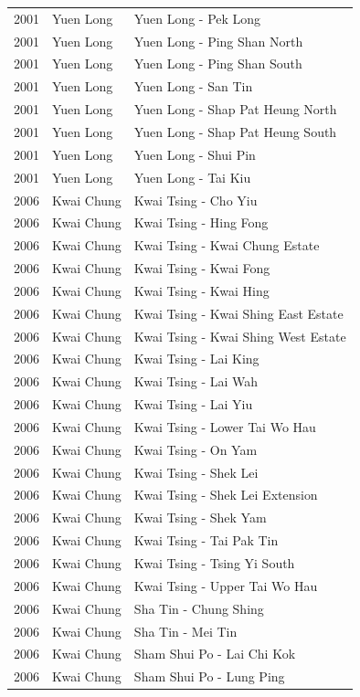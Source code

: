 \begin{longtable}{p{1.2cm}p{3cm}p{7cm}}
2001 & Yuen Long & Yuen Long - Pek Long \\
2001 & Yuen Long & Yuen Long - Ping Shan North \\
2001 & Yuen Long & Yuen Long - Ping Shan South \\
2001 & Yuen Long & Yuen Long - San Tin \\
2001 & Yuen Long & Yuen Long - Shap Pat Heung North \\
2001 & Yuen Long & Yuen Long - Shap Pat Heung South \\
2001 & Yuen Long & Yuen Long - Shui Pin \\
2001 & Yuen Long & Yuen Long - Tai Kiu \\
2006 & Kwai Chung & Kwai Tsing - Cho Yiu \\
2006 & Kwai Chung & Kwai Tsing - Hing Fong \\
2006 & Kwai Chung & Kwai Tsing - Kwai Chung Estate \\
2006 & Kwai Chung & Kwai Tsing - Kwai Fong \\
2006 & Kwai Chung & Kwai Tsing - Kwai Hing \\
2006 & Kwai Chung & Kwai Tsing - Kwai Shing East Estate \\
2006 & Kwai Chung & Kwai Tsing - Kwai Shing West Estate \\
2006 & Kwai Chung & Kwai Tsing - Lai King \\
2006 & Kwai Chung & Kwai Tsing - Lai Wah \\
2006 & Kwai Chung & Kwai Tsing - Lai Yiu \\
2006 & Kwai Chung & Kwai Tsing - Lower Tai Wo Hau \\
2006 & Kwai Chung & Kwai Tsing - On Yam \\
2006 & Kwai Chung & Kwai Tsing - Shek Lei \\
2006 & Kwai Chung & Kwai Tsing - Shek Lei Extension \\
2006 & Kwai Chung & Kwai Tsing - Shek Yam \\
2006 & Kwai Chung & Kwai Tsing - Tai Pak Tin \\
2006 & Kwai Chung & Kwai Tsing - Tsing Yi South \\
2006 & Kwai Chung & Kwai Tsing - Upper Tai Wo Hau \\
2006 & Kwai Chung & Sha Tin - Chung Shing \\
2006 & Kwai Chung & Sha Tin - Mei Tin \\
2006 & Kwai Chung & Sham Shui Po - Lai Chi Kok \\
2006 & Kwai Chung & Sham Shui Po - Lung Ping \\

\end{longtable}
